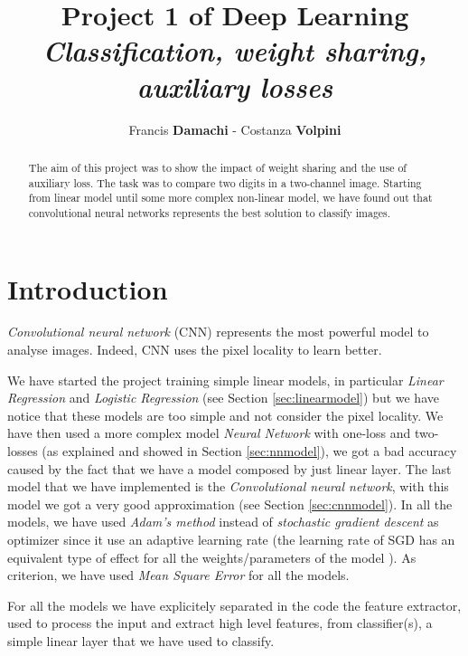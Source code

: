 \documentclass[journal, a4paper]{IEEEtran}
\begin{document}
	\title{Project 1 of Deep Learning\\ \textit{\Large{Classification, weight sharing, auxiliary losses}}}
	\author{Francis \textbf{Damachi} - Costanza \textbf{Volpini}}
	\maketitle
	
\begin{abstract}
The aim of this project was to show the impact of weight sharing and the use of auxiliary loss. The task was to compare two digits in a two-channel image. Starting from linear model until some more complex non-linear model, we have found out that convolutional neural networks represents the best solution to classify images.
\end{abstract}

\section{Introduction}
\label{sec:intro}
\textit{Convolutional neural network} (CNN) represents the most powerful model to analyse images. Indeed, CNN uses the pixel locality to learn better. 

We have started the project training simple linear models, in particular \textit{Linear Regression} and \textit{Logistic Regression} (see Section \ref{sec:linearmodel}) but we have notice that these models are too simple and not consider the pixel locality. We have then used a more complex model \textit{Neural Network} with one-loss and two-losses (as explained and showed in Section \ref{sec:nnmodel}), we got a bad accuracy caused by the fact that we have a model composed by just linear layer. The last model that we have implemented is the \textit{Convolutional neural network}, with this model we got a very good approximation (see Section \ref{sec:cnnmodel}).
In all the models, we have used \textit{Adam's method} instead of \textit{stochastic gradient descent} as optimizer since it use an adaptive learning rate (the learning rate of SGD has an equivalent type of effect for all the weights/parameters of the model \cite{reference0}).
As criterion, we have used \textit{Mean Square Error} for all the models.

For all the models we have explicitely separated in the code the feature extractor, used to process the input and extract high level features, from classifier(s), a simple linear layer that we have used to classify.
\end{document}
